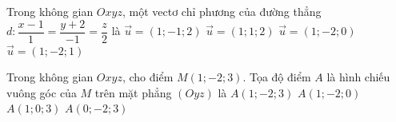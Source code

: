 \begin{ex}%
	Trong không gian $Oxyz$, một vectơ chỉ phương của đường thẳng $d\colon \dfrac{x-1}{1}=\dfrac{y+2}{-1}=\dfrac{z}{2}$ là
	\choice
	{\True $\overrightarrow{u}=(1;-1;2)$}
	{$\overrightarrow{u}=(1;1;2)$}
	{$\overrightarrow{u}=(1;-2;0)$}
	{$\overrightarrow{u}=(1;-2;1)$}
\end{ex}

\begin{ex}%
	Trong không gian $Oxyz$, cho điểm $M(1;-2;3)$. Tọa độ điểm $A$ là hình chiếu vuông góc của $M$ trên mặt phẳng $(Oyz)$ là
	\choice
	{$A(1;-2;3)$}
	{$A(1;-2;0)$}
	{$A(1;0;3)$}
	{\True $A(0;-2;3)$}
\end{ex}

